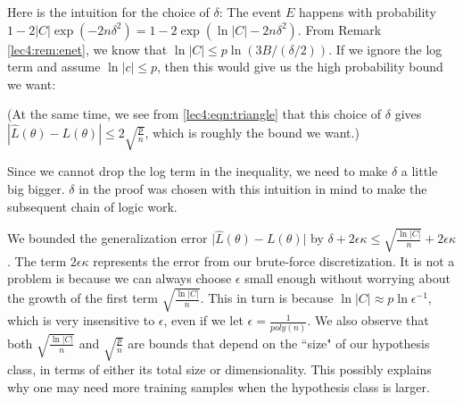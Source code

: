 \begin{remark}\label{lec4:rem:delta}
Here is the intuition for the choice of $\delta$: The event $E$ happens with probability $1 - 2|C|\exp(-2n\delta^2) = 1 - 2 \exp(\ln{|C|} - 2n\delta^2)$. From Remark \ref{lec4:rem:enet}, we know that $\ln{|C|} \leq p \ln{ (3B / (\delta / 2)) }$. If we ignore the log term and assume $\ln{|c|} \leq p$, then this would give us the high probability bound we want:

(At the same time, we see from \eqref{lec4:eqn:triangle} that this choice of $\delta$ gives $|\hat L(\theta)- L(\theta)| \le 2 \sqrt{\frac{p}{n}}$, which is roughly the bound we want.)

Since we cannot drop the log term in the inequality, we need to make $\delta$ a little big bigger. $\delta$ in the proof was chosen with this intuition in mind to make the subsequent chain of logic work.
\end{remark}

\begin{remark}
We bounded the generalization error $\vert \hat L(\theta) - L(\theta) \vert$ by $\delta + 2\epsilon \kappa \leq \sqrt{\frac{\ln{\vert C \vert}}{n}} + 2\epsilon \kappa$. The term $2\epsilon \kappa$ represents the error from our brute-force discretization. It is not a problem is because we can always choose $\epsilon$ small enough without worrying about the growth of the first term $\sqrt{\frac{\ln{\vert C \vert}}{n}}$. This in turn is because $\ln{\vert C \vert} \approx p\ln{\epsilon^{-1}}$, which is very insensitive to $\epsilon$, even if we let $\epsilon = \frac{1}{poly(n)}$. We also observe that both $\sqrt{\frac{\ln{\vert C \vert}}{n}}$ and $\sqrt{\frac{p}{n}}$ are bounds that depend on the ``size" of our hypothesis class, in terms of either its total size or dimensionality. This possibly explains why one may need more training samples when the hypothesis class is larger.
\end{remark}
